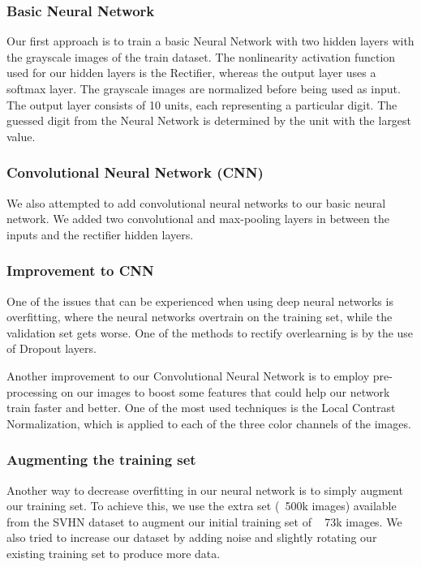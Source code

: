 \documentclass{article} %
\begin{document}
\subsubsection{Basic Neural Network}
Our first approach is to train a basic Neural Network with two hidden layers with the grayscale images of the train dataset. The nonlinearity activation function used for our hidden layers is the Rectifier\cite{relu}, whereas the output layer uses a softmax layer. The grayscale images are normalized before being used as input. The output layer consists of 10 units, each representing a particular digit. The guessed digit from the Neural Network is determined by the unit with the largest value.

\subsubsection{Convolutional Neural Network (CNN)}
We also attempted to add convolutional neural networks to our basic neural network. We added two convolutional and max-pooling layers in between the inputs and the rectifier hidden layers.


\subsubsection{Improvement to CNN}
One of the issues that can be experienced when using deep neural networks is overfitting, where the neural networks overtrain on the training set, while the validation set gets worse. One of the methods to rectify overlearning is by the use of Dropout layers.

Another improvement to our Convolutional Neural Network is to employ pre-processing on our images to boost some features that could help our network train faster and better. One of the most used techniques is the Local Contrast Normalization, which is applied to each of the three color channels of the images.

\subsubsection{Augmenting the training set}
Another way to decrease overfitting in our neural network is to simply augment our training set. To achieve this, we use the extra set (~500k images) available from the SVHN dataset to augment our initial training set of ~ 73k images. We also tried to increase our dataset by adding noise and slightly rotating our existing training set to produce more data.
\end{document}
